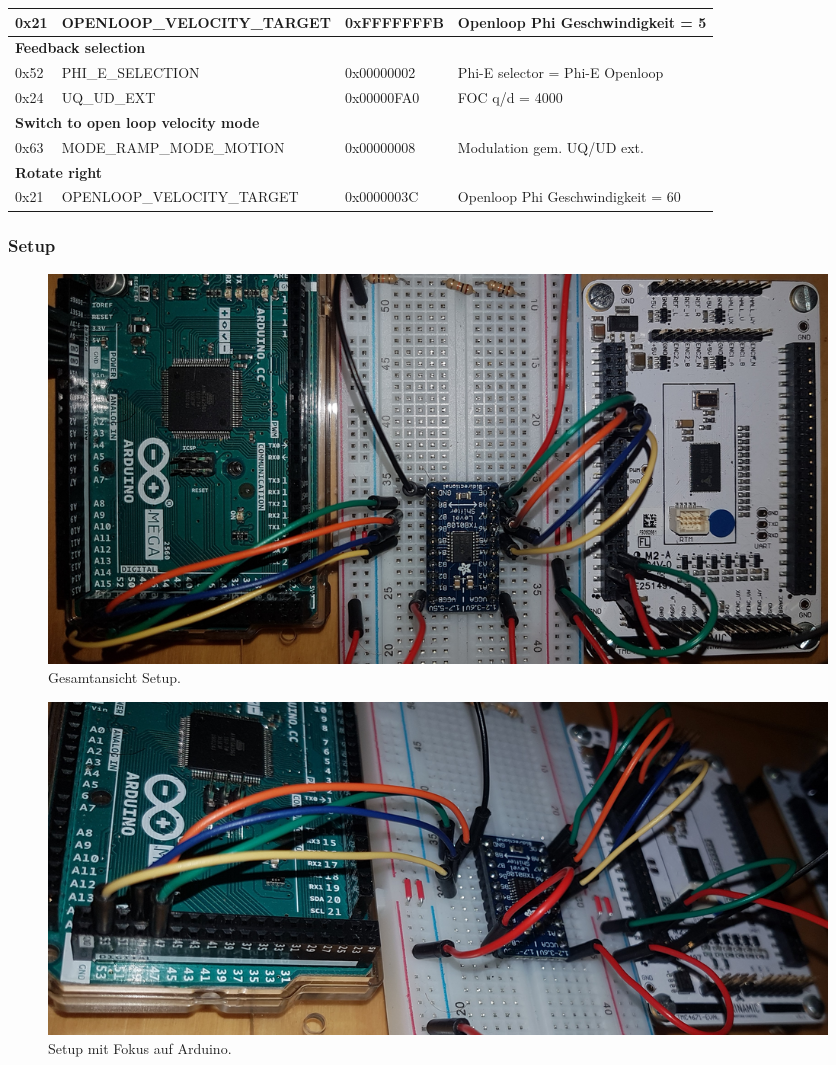 \begin{table}[H]
\begin{tabularx}{\textwidth}{|l|l|l|X|}
0x21         & OPENLOOP\_VELOCITY\_TARGET  & 0xFFFFFFFB & Openloop Phi Geschwindigkeit = 5    \\ \hline
\multicolumn{4}{|l|}{\textbf{Feedback selection}}                      \\ \hline
0x52         & PHI\_E\_SELECTION           & 0x00000002 & Phi-E selector = Phi-E Openloop    \\ \hline
0x24         & UQ\_UD\_EXT                 & 0x00000FA0 & FOC q/d = 4000  \\ \hline
\multicolumn{4}{|l|}{\textbf{Switch to open loop velocity mode}}       \\ \hline
0x63         & MODE\_RAMP\_MODE\_MOTION    & 0x00000008 & Modulation gem. UQ/UD ext. \\ \hline
\multicolumn{4}{|l|}{\textbf{Rotate right}}                            \\ \hline
0x21         & OPENLOOP\_VELOCITY\_TARGET  & 0x0000003C & Openloop Phi Geschwindigkeit = 60    \\ \hline
\end{tabularx}
\end{table}

\subsubsection{Setup}\label{Appendix:TMC4671_Setup}


\begin{figure}[H]
	\centering
	\includegraphics[angle=270,width=\textwidth]{graphics/1_komplett}
	\caption{Gesamtansicht Setup.}
	\label{fig:1_komplett}
\end{figure}

\begin{figure}[H]
	\centering
	\includegraphics[width=\textwidth]{graphics/1_Arduino}
	\caption{Setup mit Fokus auf Arduino.}
	\label{fig:1_Arduino}
\end{figure}

